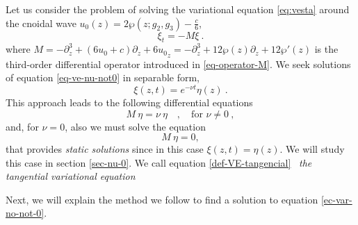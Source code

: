 \documentclass[a4paper,12pt]{article}
\begin{document}
Let us consider the problem of solving the variational equation \eqref{eq:vesta} around the cnoidal wave $u_0 (z)=2\wp\left( 
      {z} ; {g_2 }  , {g_3 }  \right) -\frac{c}{6}$, 
 \begin{equation}\label{eq-ve-nu-not0}
 \xi_t = - M\xi \ .
\end{equation}
where $ M={-\partial_z^3+(6u_0+c)\partial_z  +6{u_0}_z
} = -\partial_z^3+12\wp(z)\partial_z  + 12\wp'(z) $ is the third-order differential operator introduced in \eqref{eq-operator-M}. We seek solutions of equation \eqref{eq-ve-nu-not0} in separable form, 
\begin{equation}
 \xi(z, t )=e^{-\nu t} \eta(z) \ .   
\end{equation}
This approach leads to the following differential equations
\begin{equation}\label{ec-var-no-not-0}
    M\ {\eta}=\nu \ {\eta} \quad , \quad \textrm{for }\nu\not= 0 \ ,
\end{equation}
and, for $\nu= 0$, also  we must solve the equation
\begin{equation}\label{def-VE-tangencial}
    M\ {\eta}=0 ,
\end{equation}
that provides {\it static solutions } since in this case  $\xi(z ,t)= \eta(z)$. We will study this case in section \ref{sec-nu-0}. We call equation  \eqref{def-VE-tangencial} \ {\it the tangential variational equation}

\medskip

Next, we will explain the method we follow to find a solution to equation \eqref{ec-var-no-not-0}. 
\end{document}
